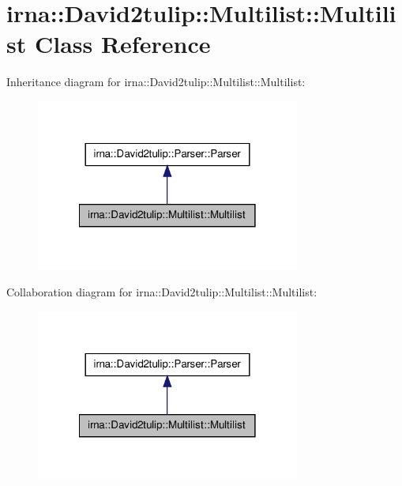 \hypertarget{classirna_1_1David2tulip_1_1Multilist_1_1Multilist}{
\section{irna\-:\-:\-David2tulip\-:\-:\-Multilist\-:\-:\-Multilist \-Class \-Reference}
\label{classirna_1_1David2tulip_1_1Multilist_1_1Multilist}
}


\-Inheritance diagram for irna\-:\-:\-David2tulip\-:\-:\-Multilist\-:\-:\-Multilist\-:\nopagebreak
\begin{figure}[H]
\begin{center}
\leavevmode
\includegraphics[width=246pt]{classirna_1_1David2tulip_1_1Multilist_1_1Multilist__inherit__graph}
\end{center}
\end{figure}


\-Collaboration diagram for irna\-:\-:\-David2tulip\-:\-:\-Multilist\-:\-:\-Multilist\-:\nopagebreak
\begin{figure}[H]
\begin{center}
\leavevmode
\includegraphics[width=246pt]{classirna_1_1David2tulip_1_1Multilist_1_1Multilist__coll__graph}
\end{center}
\end{figure}
